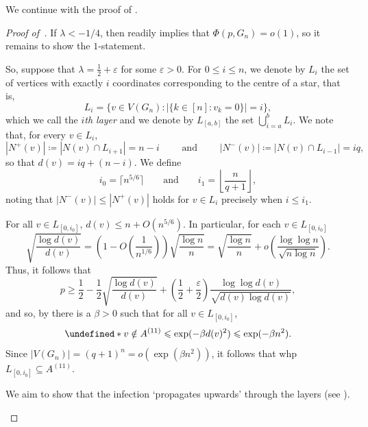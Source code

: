 \documentclass[reqno,a4paper,11pt]{amsart}
\newcounter{prop}
\theoremstyle{definition}
\renewcommand{\leq}{\leqslant}
\renewcommand{\geq}{\geqslant}
\newcommand{\eps}{\varepsilon}
\let\Pr\undefined
\begin{document}
We continue with the proof of .

\begin{proof}[Proof of~]
  If $\lambda < -1/4$, then  readily implies that $\Phi(p,G_n) = o(1)$, so it remains to show the $1$-statement.

  So, suppose that $\lambda =\frac{1}{2}+\eps$ for some $\eps>0$.
  For $0 \leq i \leq n$, we denote by $L_i$ the set of vertices with exactly $i$ coordinates corresponding to the centre of a star, that is,
  \[
    L_i = \{ v \in V(G_n) \colon |\{k \in [n]: v_k = 0\}| = i\},
  \]
  which we call the \emph{$i$th layer} and we denote by $L_{[a, b]}$ the set $\bigcup_{i=a}^b L_i$.
  We note that, for every $v \in L_i$,
  \begin{equation}\label{e:degrees}
    \left|N^+(v)\right| \coloneqq |N(v) \cap L_{i+1}| = n-i \qquad \text{ and } \qquad \left|N^-(v)\right| \coloneqq |N(v) \cap L_{i-1}| = iq,
  \end{equation}
  so that $d(v) = iq + (n-i)$.
  We define
  \[
    i_0 = \lceil n^{5/6} \rceil \qquad\text{and}\qquad i_1 = \left\lfloor \frac{n}{q+1} \right\rfloor,
  \]
  noting that $|N^-(v)| \leq |N^+(v)|$ holds for $v \in L_i$ precisely when $i \leq i_1$.

  For all $v \in L_{[0,i_0]}$, $d(v) \leq n + O(n^{5/6})$.
  In particular, for each $v \in L_{[0,i_0]}$
  \[
    \sqrt{\frac{\log d(v)}{d(v)}}=\left(1-O\left(\frac{1}{n^{1/6}}\right)\right) \sqrt{\frac{\log n}{n}} = \sqrt{\frac{\log n}{n}} + o\left(\frac{\log \log n}{\sqrt{n \log n}}\right).
  \]
  Thus, it follows that
  \[
    p \geq \frac{1}{2} - \frac{1}{2} \sqrt{\frac{\log d(v)}{d(v)}} + \left(\frac{1}{2}+\frac{\eps}{2}\right) \frac{\log \log d(v)}{\sqrt{d(v) \log d(v)}},
  \]
  and so, by  there is a $\beta>0$ such that for all $v \in L_{[0,i_0]}$,
  \[
    \Pr*{v \notin A^{(11)}} \leq \exp(-\beta d(v)^2) \leq \exp(-\beta n^2).
  \]
  Since $|V(G_n)| = (q+1)^n = o\left( \exp(\beta n^2) \right)$, it follows that whp $L_{[0,i_0]} \subseteq A^{(11)}$.

  We aim to show that the infection `propagates upwards' through the layers (see ).
  \begin{figure}
    \centering
\end{figure}
\end{proof}
\end{document}
